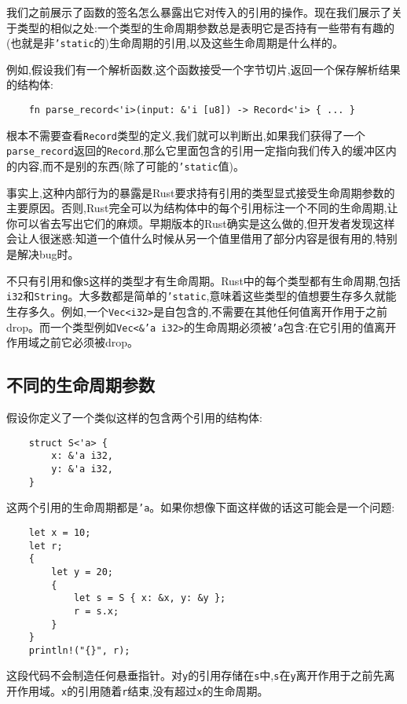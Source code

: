 我们之前展示了函数的签名怎么暴露出它对传入的引用的操作。现在我们展示了关于类型的相似之处:一个类型的生命周期参数总是表明它是否持有一些带有有趣的(也就是非\texttt{'static}的)生命周期的引用,以及这些生命周期是什么样的。

例如,假设我们有一个解析函数,这个函数接受一个字节切片,返回一个保存解析结果的结构体:
\begin{verbatim}
    fn parse_record<'i>(input: &'i [u8]) -> Record<'i> { ... }
\end{verbatim}

根本不需要查看\texttt{Record}类型的定义,我们就可以判断出,如果我们获得了一个\texttt{parse\_record}返回的\texttt{Record},那么它里面包含的引用一定指向我们传入的缓冲区内的内容,而不是别的东西(除了可能的\texttt{'static}值)。

事实上,这种内部行为的暴露是Rust要求持有引用的类型显式接受生命周期参数的主要原因。否则,Rust完全可以为结构体中的每个引用标注一个不同的生命周期,让你可以省去写出它们的麻烦。早期版本的Rust确实是这么做的,但开发者发现这样会让人很迷惑:知道一个值什么时候从另一个值里借用了部分内容是很有用的,特别是解决bug时。

不只有引用和像\texttt{S}这样的类型才有生命周期。Rust中的每个类型都有生命周期,包括\texttt{i32}和\texttt{String}。大多数都是简单的\texttt{'static},意味着这些类型的值想要生存多久就能生存多久。例如,一个\texttt{Vec<i32>}是自包含的,不需要在其他任何值离开作用于之前drop。而一个类型例如\texttt{Vec<\&'a i32>}的生命周期必须被\texttt{'a}包含:在它引用的值离开作用域之前它必须被drop。

\subsection{不同的生命周期参数}\label{DistLife}
假设你定义了一个类似这样的包含两个引用的结构体:
\begin{verbatim}
    struct S<'a> {
        x: &'a i32,
        y: &'a i32,
    }
\end{verbatim}

这两个引用的生命周期都是\texttt{'a}。如果你想像下面这样做的话这可能会是一个问题:
\begin{verbatim}
    let x = 10;
    let r;
    {
        let y = 20;
        {
            let s = S { x: &x, y: &y };
            r = s.x;
        }
    }
    println!("{}", r);
\end{verbatim}

这段代码不会制造任何悬垂指针。对\texttt{y}的引用存储在\texttt{s}中,\texttt{s}在\texttt{y}离开作用于之前先离开作用域。\texttt{x}的引用随着\texttt{r}结束,没有超过\texttt{x}的生命周期。

